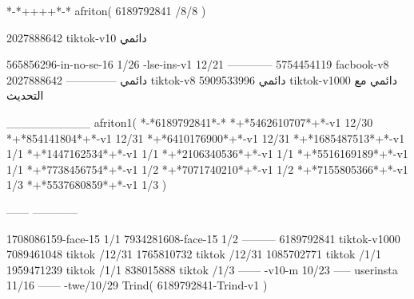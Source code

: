 *-*++++*-*
afriton(
6189792841 /8/8
)

2027888642 tiktok-v10
دائمي

565856296-in-no-se-16 1/26
-lse-ins-v1 12/21
------------
5754454119 facbook-v8
دائمي
--------------
2027888642 tiktok-v8
دائمي
5909533996 tiktok-v1000
دائمي مع التحديث

__________
afriton1(
*-*6189792841*-*
*+*5462610707*+*-v1 12/30
*+*854141804*+*-v1 12/31
*+*6410176900*+*-v1 12/31
*+*1685487513*+*-v1 1/1
*+*1447162534*+*-v1 1/1
*+*2106340536*+*-v1 1/1
*+*5516169189*+*-v1 1/1
*+*7738456754*+*-v1 1/2
*+*7071740210*+*-v1 1/2
*+*7155805366*+*-v1 1/3
*+*5537680859*+*-v1 1/3
)

------
------------

1708086159-face-15 1/1
7934281608-face-15 1/2
---------
6189792841 tiktok-v1000
7089461048 tiktok /12/31
1765810732 tiktok /12/31
1085702771 tiktok /1/1
1959471239 tiktok /1/1
838015888 tiktok /1/3
------
-v10-m 10/23
-----
userinsta 11/16
------
-twe/10/29
Trind(
6189792841-Trind-v1 
)
